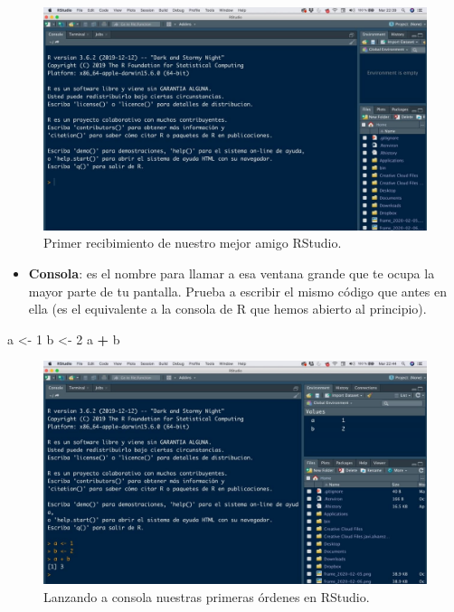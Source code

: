 \documentclass[11pt,]{book}
\newenvironment{Shaded}{\begin{snugshade}}{\end{snugshade}}
\newcommand{\DecValTok}[1]{\textcolor[rgb]{0.06,0.06,0.06}{#1}}
\newcommand{\NormalTok}[1]{#1}
\newcommand{\OperatorTok}[1]{\textcolor[rgb]{0.43,0.43,0.43}{\textbf{#1}}}
\newcommand{\StringTok}[1]{\textcolor[rgb]{0.5,0.5,0.5}{#1}}
\providecommand{\tightlist}{%
  \setlength{\itemsep}{0pt}\setlength{\parskip}{0pt}}
\begin{document}
\begin{figure}

{\centering \includegraphics[width=0.75\linewidth]{./img/inicio_rstudio_1} 

}

\caption{Primer recibimiento de nuestro mejor amigo RStudio.}\label{fig:inicio-rstudio-1}
\end{figure}

\begin{itemize}
\tightlist
\item
  \textbf{Consola}: es el nombre para llamar a esa ventana grande que te ocupa la mayor parte de tu pantalla. Prueba a escribir el mismo código que antes en ella (es el equivalente a la consola de R que hemos abierto al principio).
\end{itemize}

\begin{Shaded}
\begin{Highlighting}[]
\NormalTok{a <-}\StringTok{ }\DecValTok{1}
\NormalTok{b <-}\StringTok{ }\DecValTok{2}
\NormalTok{a }\OperatorTok{+}\StringTok{ }\NormalTok{b}
\end{Highlighting}
\end{Shaded}

\begin{figure}

{\centering \includegraphics[width=0.75\linewidth]{./img/inicio_rstudio_2} 

}

\caption{Lanzando a consola nuestras primeras órdenes en RStudio.}\label{fig:inicio-rstudio-2}
\end{figure}
\end{document}
